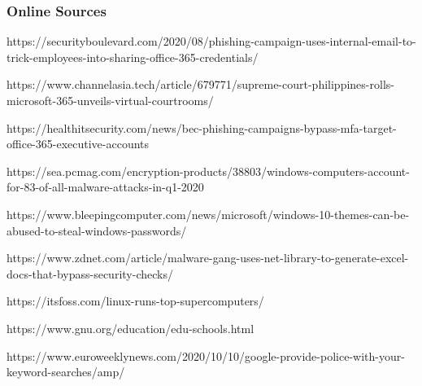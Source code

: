 \documentclass[17pt]{beamer}
\begin{document}
		\begin{frame}
			\frametitle{Online Sources}
			\tiny 
			 
			https://securityboulevard.com/2020/08/phishing-campaign-uses-internal-email-to-trick-employees-into-sharing-office-365-credentials/
\newline
			
			https://www.channelasia.tech/article/679771/supreme-court-philippines-rolls-microsoft-365-unveils-virtual-courtrooms/
\newline
			
			https://healthitsecurity.com/news/bec-phishing-campaigns-bypass-mfa-target-office-365-executive-accounts \newline
			
			https://sea.pcmag.com/encryption-products/38803/windows-computers-account-for-83-of-all-malware-attacks-in-q1-2020 \newline
			
			https://www.bleepingcomputer.com/news/microsoft/windows-10-themes-can-be-abused-to-steal-windows-passwords/ \newline
			
			https://www.zdnet.com/article/malware-gang-uses-net-library-to-generate-excel-docs-that-bypass-security-checks/ \newline
			
			https://itsfoss.com/linux-runs-top-supercomputers/ \newline
			
			https://www.gnu.org/education/edu-schools.html \newline
			
			https://www.euroweeklynews.com/2020/10/10/google-provide-police-with-your-keyword-searches/amp/
		\end{frame}	
	
\end{document}

